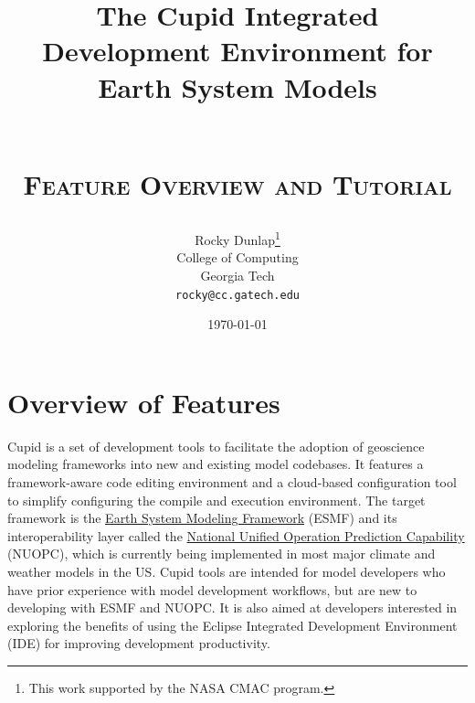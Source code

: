 \documentclass[oneside,11pt]{memoir}
\begin{document}
	\title{The Cupid Integrated Development Environment for Earth System Models
	
	\\ \vspace{20pt} \textsc{\textbf{Feature Overview and Tutorial}}}
	
	\author{Rocky Dunlap\thanks{This work supported by the NASA CMAC program.}\\
		College of Computing\\
		Georgia Tech\\
		\texttt{rocky@cc.gatech.edu}}
	\date{\today}

\maketitle



\clearpage
\tableofcontents

\chapter{Overview of Features}

Cupid is a set of development tools to facilitate the adoption of geoscience modeling frameworks into new and existing model codebases.  It features a framework-aware code editing environment and a cloud-based configuration tool to simplify configuring the compile and execution environment.  The target framework is the \href{http://www.earthsystemmodeling.org/}{Earth System Modeling Framework} (ESMF) and its interoperability layer called the \href{https://earthsystemcog.org/projects/nuopc/}{National Unified Operation Prediction Capability} (NUOPC), which is currently being implemented in most major climate and weather models in the US. Cupid tools are intended for model developers who have prior experience with model development workflows, but are new to developing with ESMF and NUOPC.  It is also aimed at developers interested in exploring the benefits of using the Eclipse Integrated Development Environment (IDE) for improving development productivity.
\end{document}
